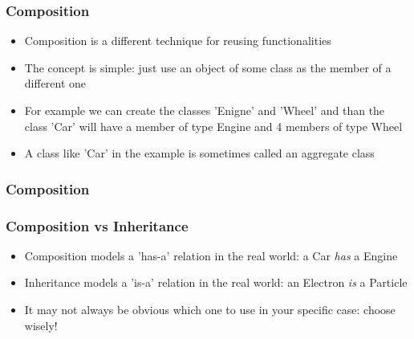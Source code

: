 \documentclass[9pt]{beamer}
\begin{document}
\begin{frame}
  \frametitle{Composition}
    
  \begin{itemize}
    \item \alert{Composition} is a different technique for reusing functionalities
    \medskip
    \item The concept is simple: just use an object of some class as the member of a different one
    \medskip
    \item For example we can create the classes 'Enigne' and 'Wheel' and than the class 'Car' will have
          a member of type Engine and 4 members of type Wheel
    \medskip
    \item A class like 'Car' in the example is sometimes called an \alert{aggregate} class
  \end{itemize}
  
\end{frame}


\begin{frame}
  \frametitle{Composition}
  
\end{frame}


\begin{frame}
  \frametitle{Composition vs Inheritance}
    
  \begin{itemize}
    \item Composition models a \alert{'has-a'} relation in the real world: a Car \emph{has} a Engine
    \medskip
    \item Inheritance models a \alert{'is-a'} relation in the real world: an Electron \emph{is} a Particle
    \medskip
    \item It may not always be obvious which one to use in your specific case: choose wisely!
  \end{itemize}
  
\end{frame}
\end{document}
